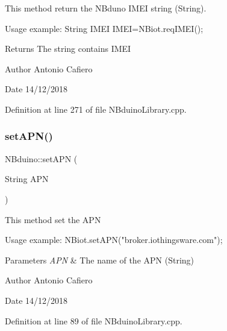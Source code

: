 This method return the N\+Bduno I\+M\+EI string (String). 
\begin{DoxyCode}
Usage example:
    String IMEI
    IMEI=NBiot.reqIMEI();
\end{DoxyCode}
 \begin{DoxyReturn}{Returns}
The string contains I\+M\+EI 
\end{DoxyReturn}
\begin{DoxyAuthor}{Author}
Antonio Cafiero 
\end{DoxyAuthor}
\begin{DoxyDate}{Date}
14/12/2018 
\end{DoxyDate}


Definition at line 271 of file N\+Bduino\+Library.\+cpp.

\mbox{\label{class_n_bduino_a9a903295305e847b3d68a7a6cc111316}} 
\subsubsection{\texorpdfstring{set\+A\+P\+N()}{setAPN()}}
{\footnotesize\ttfamily N\+Bduino\+::set\+A\+PN (\begin{DoxyParamCaption}\item[{String}]{A\+PN }\end{DoxyParamCaption})}

This method set the A\+PN 
\begin{DoxyCode}
Usage example:
    NBiot.setAPN(\textcolor{stringliteral}{"broker.iothingsware.com"});
\end{DoxyCode}
 
\begin{DoxyParams}{Parameters}
{\em A\+PN} & The name of the A\+PN (String) \\
\hline
\end{DoxyParams}
\begin{DoxyAuthor}{Author}
Antonio Cafiero 
\end{DoxyAuthor}
\begin{DoxyDate}{Date}
14/12/2018 
\end{DoxyDate}


Definition at line 89 of file N\+Bduino\+Library.\+cpp.

\mbox{\label{class_n_bduino_ac7bf8f7f0552ad2cbda4b3e91a82bfca}} 
